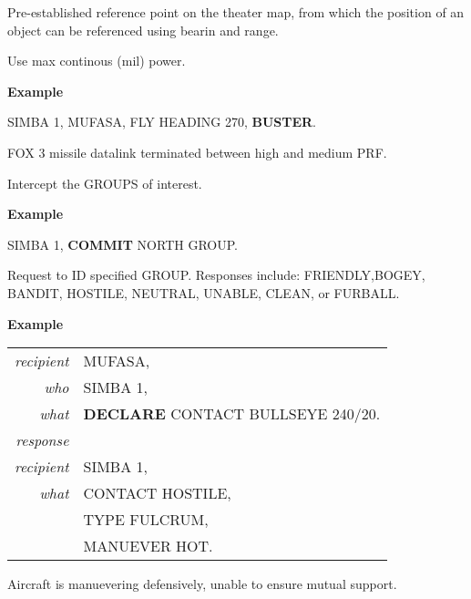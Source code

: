 \begin{tcoloritemize}
    \blueitem[BULLSEYE] 
    Pre-established reference point on the theater map, from which the position 
    of an object can be referenced using bearin and range.

    \blueitem[BUSTER] 
    Use max continous (mil) power.

    \medskip
    \textbf{Example}
    \begin{center}
        \begin{minipage}{0.9\textwidth}
            SIMBA 1, MUFASA, FLY HEADING 270, \textbf{BUSTER}.
        \end{minipage}
    \end{center}

    \blueitem[CHEAPSHOT] 
    FOX 3 missile datalink terminated between high and medium PRF.

    \blueitem[COMMIT] 
    Intercept the GROUPS of interest.

    \medskip
    \textbf{Example}
    \begin{center}
        \begin{minipage}{0.9\textwidth}
            SIMBA 1, \textbf{COMMIT} NORTH GROUP.
        \end{minipage}
    \end{center}

    \blueitem[DECLARE] 
    Request to ID specified GROUP. Responses include: 
    FRIENDLY,BOGEY, BANDIT, HOSTILE, NEUTRAL,
    UNABLE, CLEAN, or FURBALL. 

    \medskip
    \textbf{Example}
    \begin{center}
        \begin{tabular}{>{\itshape}r l}
            recipient & MUFASA, \\
            who & SIMBA 1, \\
            what & \textbf{DECLARE} CONTACT BULLSEYE 240/20. \\
            response \\
            recipient & SIMBA 1, \\
            what & CONTACT HOSTILE, \\
            & TYPE FULCRUM, \\
            & MANUEVER HOT. \\
        \end{tabular}
    \end{center}

    \blueitem[DEFENSIVE] 
    Aircraft is manuevering defensively, unable to ensure mutual support. 


\end{tcoloritemize}
